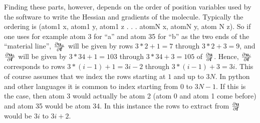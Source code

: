 Finding these parts, however, depends on the order of position variables used by the software to write the Hessian and gradients of the molecule.  
Typically the ordering is 
(atom1 x, atom1 y, atom1 z  . . . atomN x, atomN y, atom N z). 
So if one uses for example atom 3 for ``a'' and atom 35 for ``b'' as the two ends of the ``material line'',  $\frac{\partial {\bf{u}}_a}{\partial {\bf{f}}}$
will be given by rows $3*2+1=7$ through $3*2+3=9$, and $\frac{\partial {\bf{u}}_b}{\partial {\bf{f}}}$ will be given by $3*34+1=103$ through $3*34+3=105$ of $\frac{\partial {\bf{u}}}{\partial {\bf{f}}}$.  
Hence, $\frac{\partial {\bf{u}}_i}{\partial {\bf{f}}}$
corresponds to rows $3*(i-1)+1=3i-2$ through $3*(i-1)+3=3i$. 
This of course assumes that we index the rows starting at $1$ and up to $3N$.  
In python and other languages it is common
to index starting from $0$ to $3N-1$. 
If this is the case, then atom 3 would actually be atom 2 (atom 0 and atom 1 come before) and atom 35 would be atom 34.  
In this instance the 
rows to extract from $\frac{\partial {\bf{u}}}{\partial {\bf{f}}}$ would be $3i$ to $3i+2$.  








